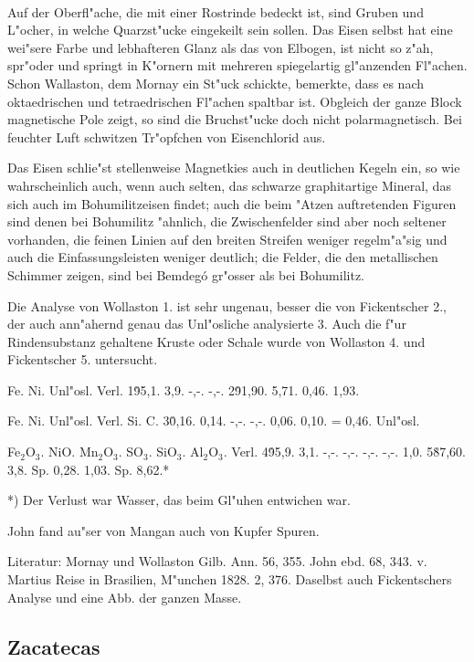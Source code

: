 \documentclass[a4paper, 11pt, oneside]{article}
\begin{document}
\paragraph{}
Auf der Oberfl"ache, die mit einer Rostrinde bedeckt ist, sind Gruben und L"ocher, in welche Quarzst"ucke eingekeilt sein sollen. Das Eisen selbst hat eine wei"sere Farbe und lebhafteren Glanz als das von Elbogen, ist nicht so z"ah, spr"oder und springt in K"ornern mit mehreren spiegelartig gl"anzenden Fl"achen. Schon Wallaston, dem Mornay ein St"uck schickte, bemerkte, dass es nach oktaedrischen und tetraedrischen Fl"achen spaltbar ist. Obgleich der ganze Block magnetische Pole zeigt, so sind die Bruchst"ucke doch nicht polarmagnetisch. Bei feuchter Luft schwitzen Tr"opfchen von Eisenchlorid aus.

Das Eisen schlie"st stellenweise Magnetkies auch in deutlichen Kegeln ein, so wie wahrscheinlich auch, wenn auch selten, das schwarze graphitartige Mineral, das sich auch im Bohumilitzeisen findet; auch die beim "Atzen auftretenden Figuren sind denen bei Bohumilitz "ahnlich, die Zwischenfelder sind aber noch seltener vorhanden, die feinen Linien auf den breiten Streifen weniger regelm"a"sig und auch die Einfassungsleisten weniger deutlich; die Felder, die den metallischen Schimmer zeigen, sind bei Bemdegó gr"osser als bei Bohumilitz.

Die Analyse von Wollaston 1. ist sehr ungenau, besser die von Fickentscher 2., der auch ann"ahernd genau das Unl"osliche analysierte 3. Auch die f"ur Rindensubstanz gehaltene Kruste oder Schale wurde von Wollaston 4. und Fickentscher 5. untersucht.

Fe. Ni. Unl"osl. Verl.  
1\. 95,1. 3,9. -,-. -,-.  
2\. 91,90. 5,71. 0,46. 1,93.  

Fe. Ni. Unl"osl. Verl. Si. C.  
3\. 0,16. 0,14. -,-. -,-. 0,06. 0,10. = 0,46. Unl"osl.  

Fe$_{2}$O$_{3}$. NiO. Mn$_{2}$O$_{3}$. SO$_{3}$. SiO$_{3}$. Al$_{2}$O$_{3}$. Verl.  
4\. 95,9. 3,1. -,-. -,-. -,-. -,-. 1,0.  
5\. 87,60. 3,8. Sp. 0,28. 1,03. Sp. 8,62.*

*) Der Verlust war Wasser, das beim Gl"uhen entwichen war.

John fand au"ser von Mangan auch von Kupfer Spuren.

Literatur: Mornay und Wollaston Gilb. Ann. 56, 355. John ebd. 68, 343. v. Martius Reise in Brasilien, M"unchen 1828. 2, 376. Daselbst auch Fickentschers Analyse und eine Abb. der ganzen Masse.

\subsection{Zacatecas}
\normalsize
\end{document}
